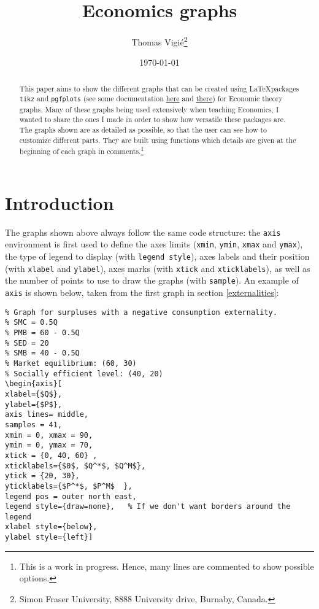 \documentclass[english]{article}
\title{Economics graphs}
\author{Thomas Vigié\footnote{Simon Fraser University, 8888 University drive, Burnaby, Canada.}}
\date{\today}
\begin{document}
\maketitle
\begin{abstract}
This paper aims to show the different graphs that can be created using \LaTeX packages  \texttt{tikz} and \texttt{pgfplots} (see some documentation \href{https://www.overleaf.com/learn/latex/pgfplots_package}{here} and \href{http://pgfplots.sourceforge.net/gallery.html}{there}) for Economic theory graphs. Many of these graphs being used extensively when teaching Economics, I wanted to share the ones I made in order to show how versatile these packages are. The graphs shown are as detailed as possible, so that the user can see how to customize different parts. They are built using functions which details are given at the beginning of each graph in comments.\footnote{This is a work in progress. Hence, many lines are commented to show possible options.}
\end{abstract}

\begingroup
\hypersetup{linkcolor = darkcyan}
\tableofcontents
\endgroup

\begingroup
\hypersetup{linkcolor = DarkRed}
\listoffigures
\endgroup

\section{Introduction}
The graphs shown above always follow the same code structure: the \texttt{axis} environment is first used to define the axes limits (\texttt{xmin}, \texttt{ymin}, \texttt{xmax} and \texttt{ymax}), the type of legend to display (with \texttt{legend style}), axes labels and their position (with \texttt{xlabel} and \texttt{ylabel}), axes marks (with \texttt{xtick} and \texttt{xticklabels}), as well as the number of points to use to draw the graphs (with \texttt{sample}). An example of \texttt{axis} is shown below, taken from the first graph in section \ref{externalities}:

\begin{lstlisting}
% Graph for surpluses with a negative consumption externality.
% SMC = 0.5Q
% PMB = 60 - 0.5Q
% SED = 20
% SMB = 40 - 0.5Q
% Market equilibrium: (60, 30)
% Socially efficient level: (40, 20)
\begin{axis}[
xlabel={$Q$}, 
ylabel={$P$},
axis lines= middle,
samples = 41, 
xmin = 0, xmax = 90,
ymin = 0, ymax = 70,
xtick = {0, 40, 60} ,
xticklabels={$0$, $Q^*$, $Q^M$},
ytick = {20, 30},
yticklabels={$P^*$, $P^M$  },
legend pos = outer north east,
legend style={draw=none},   % If we don't want borders around the legend
xlabel style={below},
ylabel style={left}]
\end{lstlisting}
\end{document}
